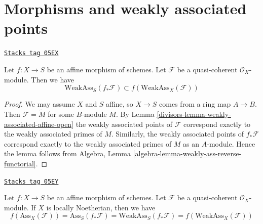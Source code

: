 \section{Morphisms and weakly associated points}
\label{divisors-section-morphisms-weakly-associated}
\begin{lemma}
\label{divisors-lemma-weakly-ass-reverse-functorial}
\href{https://stacks.math.columbia.edu/tag/05EX}{\texttt{Stacks tag 05EX}}

Let $f : X \to S$ be an affine morphism of schemes.
Let $\mathcal{F}$ be a quasi-coherent $\mathcal{O}_X$-module.
Then we have
$$
\text{WeakAss}_S(f_*\mathcal{F}) \subset f(\text{WeakAss}_X(\mathcal{F}))
$$
\end{lemma}

\begin{proof}

We may assume $X$ and $S$ affine, so $X \to S$ comes from a ring map
$A \to B$. Then $\mathcal{F} = \widetilde M$ for some $B$-module $M$. By
Lemma \ref{divisors-lemma-weakly-associated-affine-open}
the weakly associated points of $\mathcal{F}$ correspond exactly to the
weakly associated primes of $M$. Similarly, the weakly associated points
of $f_*\mathcal{F}$ correspond exactly to the weakly associated primes
of $M$ as an $A$-module. Hence the lemma follows from
Algebra, Lemma \ref{algebra-lemma-weakly-ass-reverse-functorial}.
\end{proof}

\begin{lemma}
\label{divisors-lemma-ass-functorial-equal}
\href{https://stacks.math.columbia.edu/tag/05EY}{\texttt{Stacks tag 05EY}}

Let $f : X \to S$ be an affine morphism of schemes.
Let $\mathcal{F}$ be a quasi-coherent $\mathcal{O}_X$-module.
If $X$ is locally Noetherian, then we have
$$
f(\text{Ass}_X(\mathcal{F})) =
\text{Ass}_S(f_*\mathcal{F}) =
\text{WeakAss}_S(f_*\mathcal{F}) =
f(\text{WeakAss}_X(\mathcal{F}))
$$
\end{lemma}

